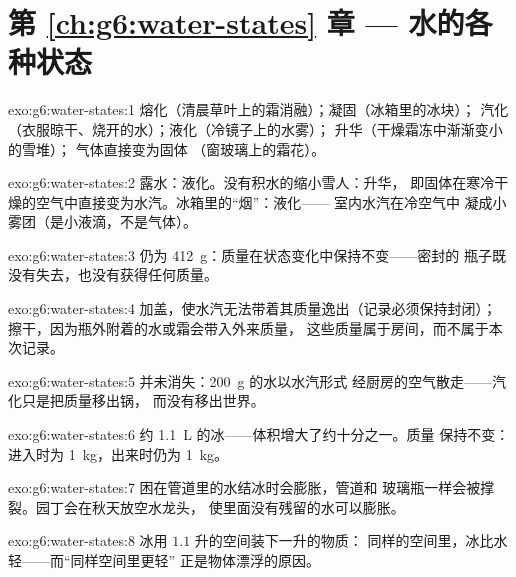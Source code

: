 \section*{第 \ref{ch:g6:water-states} 章 --- 水的各种状态}

\begin{solution}{exo:g6:water-states:1}
熔化（清晨草叶上的霜消融）；凝固（冰箱里的冰块）；
汽化（衣服晾干、烧开的水）；液化（冷镜子上的水雾）；
升华（干燥霜冻中渐渐变小的雪堆）；
气体直接变为固体
（窗玻璃上的霜花）。
\end{solution}

\begin{solution}{exo:g6:water-states:2}
露水：液化。没有积水的缩小雪人：升华，
即固体在寒冷干燥的空气中直接变为水汽。冰箱里的“烟”：液化——
室内水汽在冷空气中
凝成小雾团（是小液滴，不是气体）。
\end{solution}

\begin{solution}{exo:g6:water-states:3}
仍为 \qty{412}{g}：质量在状态变化中保持不变——密封的
瓶子既没有失去，也没有获得任何质量。
\end{solution}

\begin{solution}{exo:g6:water-states:4}
加盖，使水汽无法带着其质量逸出（记录必须保持封闭）；
擦干，因为瓶外附着的水或霜会带入外来质量，
这些质量属于房间，而不属于本次记录。
\end{solution}

\begin{solution}{exo:g6:water-states:5}
并未消失：\qty{200}{g} 的水以水汽形式
经厨房的空气散走——汽化只是把质量移出锅，
而没有移出世界。
\end{solution}

\begin{solution}{exo:g6:water-states:6}
约 \qty{1.1}{L} 的冰——体积增大了约十分之一。质量
保持不变：进入时为 \qty{1}{kg}，出来时仍为 \qty{1}{kg}。
\end{solution}

\begin{solution}{exo:g6:water-states:7}
困在管道里的水结冰时会膨胀，管道和
玻璃瓶一样会被撑裂。园丁会在秋天放空水龙头，
使里面没有残留的水可以膨胀。
\end{solution}

\begin{solution}{exo:g6:water-states:8}
冰用 $1.1$ 升的空间装下一升的物质：
同样的空间里，冰比水轻——而“同样空间里更轻”
正是物体漂浮的原因。
\end{solution}

